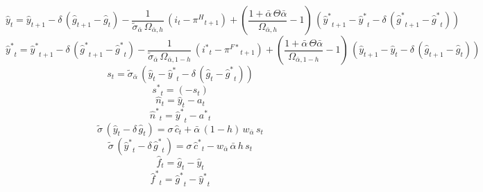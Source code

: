 \begin{dmath}
{{\hat y}}_{t}={{\hat y}}_{t+1}-{{\delta}}\, \left({{\hat g}}_{t+1}-{{\hat g}}_{t}\right)-\frac{1}{{{\tilde\sigma_{\bar{\alpha}}}}\, {{\Omega_{\bar \alpha,h}}}}\, \left({{i}}_{t}-{{\pi^H}}_{t+1}\right)+\left(\frac{1+{{\bar{\alpha}}}\, {{\Theta{\bar{\alpha}}}}}{{{\Omega_{\bar \alpha,h}}}}-1\right)\, \left({{\hat y^*}}_{t+1}-{{\hat y^*}}_{t}-{{\delta}}\, \left({{\hat g^*}}_{t+1}-{{\hat g^*}}_{t}\right)\right)
\end{dmath}
\begin{dmath}
{{\hat y^*}}_{t}={{\hat y^*}}_{t+1}-{{\delta}}\, \left({{\hat g^*}}_{t+1}-{{\hat g^*}}_{t}\right)-\frac{1}{{{\tilde\sigma_{\bar{\alpha}}}}\, {{\Omega_{\bar \alpha,1-h}}}}\, \left({{i^*}}_{t}-{{\pi^{F*}}}_{t+1}\right)+\left(\frac{1+{{\bar{\alpha}}}\, {{\Theta{\bar{\alpha}}}}}{{{\Omega_{\bar \alpha,1-h}}}}-1\right)\, \left({{\hat y}}_{t+1}-{{\hat y}}_{t}-{{\delta}}\, \left({{\hat g}}_{t+1}-{{\hat g}}_{t}\right)\right)
\end{dmath}
\begin{dmath}
{{s}}_{t}={{\tilde\sigma_{\bar{\alpha}}}}\, \left({{\hat y}}_{t}-{{\hat y^*}}_{t}-{{\delta}}\, \left({{\hat g}}_{t}-{{\hat g^*}}_{t}\right)\right)
\end{dmath}
\begin{dmath}
{{s^*}}_{t}=\left(-{{s}}_{t}\right)
\end{dmath}
\begin{dmath}
{{\hat n}}_{t}={{\hat y}}_{t}-{{a}}_{t}
\end{dmath}
\begin{dmath}
{{\hat n^*}}_{t}={{\hat y^*}}_{t}-{{a^*}}_{t}
\end{dmath}
\begin{dmath}
{{\tilde{\sigma}}}\, \left({{\hat y}}_{t}-{{\delta}}\, {{\hat g}}_{t}\right)={{\sigma}}\, {{\hat c}}_{t}+{{\bar{\alpha}}}\, \left(1-{{h}}\right)\, {{w_{\bar{\alpha}}}}\, {{s}}_{t}
\end{dmath}
\begin{dmath}
{{\tilde{\sigma}}}\, \left({{\hat y^*}}_{t}-{{\delta}}\, {{\hat g^*}}_{t}\right)={{\sigma}}\, {{\hat c^*}}_{t}-{{w_{\bar{\alpha}}}}\, {{\bar{\alpha}}}\, {{h}}\, {{s}}_{t}
\end{dmath}
\begin{dmath}
{{\hat f}}_{t}={{\hat g}}_{t}-{{\hat y}}_{t}
\end{dmath}
\begin{dmath}
{{\hat f^*}}_{t}={{\hat g^*}}_{t}-{{\hat y^*}}_{t}
\end{dmath}
